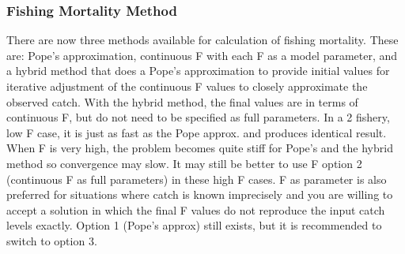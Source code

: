 \subsubsection{Fishing Mortality Method}
There are now three methods available for calculation of fishing mortality.  These are:  Pope’s approximation, continuous F with each F as a model parameter, and a hybrid method that does a Pope’s approximation to provide initial values for iterative adjustment of the continuous F values to closely approximate the observed catch.  With the hybrid method, the final values are in terms of continuous F, but do not need to be specified as full parameters.  In a 2 fishery, low F case, it is just as fast as the Pope approx. and produces identical result.  When F is very high, the problem becomes quite stiff for Pope’s and the hybrid method so convergence may slow.  It may still be better to use F option 2 (continuous F as full parameters) in these high F cases.  F as parameter is also preferred for situations where catch is known imprecisely and you are willing to accept a solution in which the final F values do not reproduce the input catch levels exactly.  Option 1 (Pope’s approx) still exists, but it is recommended to switch to option 3.

